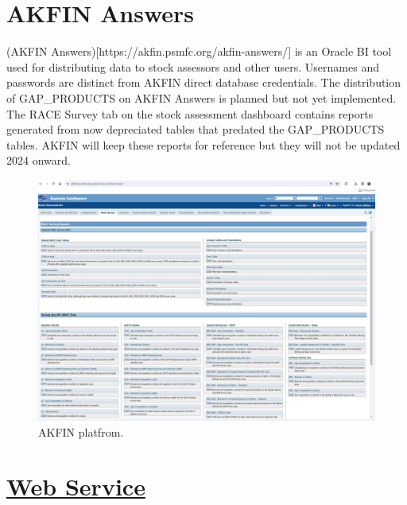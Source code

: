 \documentclass[
  letterpaper,
  oneside,
  open=any]{scrbook}
\begin{document}
\hypertarget{akfin-answers}{%
\section*{AKFIN Answers}\label{akfin-answers}}


(AKFIN Answers){[}https://akfin.psmfc.org/akfin-answers/{]} is an Oracle
BI tool used for distributing data to stock assessors and other users.
Usernames and passwords are distinct from AKFIN direct database
credentials. The distribution of GAP\_PRODUCTS on AKFIN Answers is
planned but not yet implemented. The RACE Survey tab on the stock
assessment dashboard contains reports generated from now depreciated
tables that predated the GAP\_PRODUCTS tables. AKFIN will keep these
reports for reference but they will not be updated 2024 onward.

\begin{figure}

{\centering \includegraphics[width=6.22in,height=\textheight]{content/../img/akfin.jpg}

}

\caption{AKFIN platfrom.}

\end{figure}

\hypertarget{web-service}{%
\section*{\texorpdfstring{\href{https://afsc-gap-products.github.io/gap_products/content/akfin-api-r.html}{Web
Service}}{Web Service}}\label{web-service}}
\end{document}

